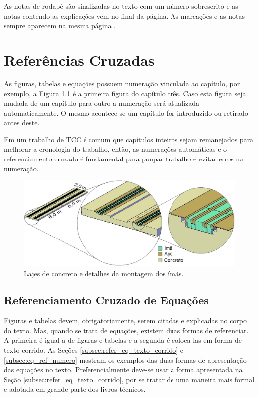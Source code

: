 \documentclass[
        oneside,      %
        english,			
        brazil			 
        ]{configcefetmglpd}
\begin{document}
As notas de rodapé são sinalizadas no texto com um número sobrescrito e as notas contendo as explicações vem no final da página. As marcações e as notas sempre aparecem na mesma página .

\chapter{Referências Cruzadas} \label{cap:ref_cruzadas}
As figuras, tabelas e equações possuem numeração vinculada ao capítulo, por exemplo, a Figura \ref{fig:lajes_concreto} é a primeira figura do capítulo três. Caso esta figura seja mudada de um capítulo para outro a numeração será atualizada automaticamente. O mesmo acontece se um capítulo for introduzido ou retirado antes deste.

Em um trabalho de TCC é comum que capítulos inteiros sejam remanejados para melhorar a cronologia do trabalho, então, as numerações automáticas e o referenciamento cruzado é fundamental para poupar trabalho e evitar erros na numeração.

\begin{figure}[h]
	\larguratexto{12cm}  %
	\caption{Lajes de concreto e detalhes da montagem dos ímãs.}
	\label{fig:lajes_concreto}
	\begin{center}
		\includegraphics[width=12cm]{cap4_1.jpg}
	\end{center}
\end{figure}

\section{Referenciamento Cruzado de Equações}
Figuras e tabelas devem, obrigatoriamente, serem citadas e explicadas no corpo do texto. Mas, quando se trata de equações, existem duas formas de referenciar. A primeira é igual a de figuras e tabelas e a segunda é coloca-las em forma de texto corrido. As Seções \ref{subsec:refer_eq_texto_corrido} e \ref{subsec:eq_ref_numero} mostram os exemplos das duas formas de apresentação das equações no texto. Preferencialmente deve-se usar a forma apresentada na Seção \ref{subsec:refer_eq_texto_corrido}, por se tratar de uma maneira mais formal e adotada em grande parte dos livros técnicos.
\end{document}
